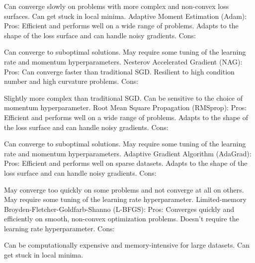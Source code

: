 Can converge slowly on problems with more complex and non-convex loss surfaces.
Can get stuck in local minima.
Adaptive Moment Estimation (Adam):
Pros:
Efficient and performs well on a wide range of problems.
Adapts to the shape of the loss surface and can handle noisy gradients.
Cons:

Can converge to suboptimal solutions.
May require some tuning of the learning rate and momentum hyperparameters.
Nesterov Accelerated Gradient (NAG):
Pros:
Can converge faster than traditional SGD.
Resilient to high condition number and high curvature problems.
Cons:

Slightly more complex than traditional SGD.
Can be sensitive to the choice of momentum hyperparameter.
Root Mean Square Propagation (RMSprop):
Pros:
Efficient and performs well on a wide range of problems.
Adapts to the shape of the loss surface and can handle noisy gradients.
Cons:

Can converge to suboptimal solutions.
May require some tuning of the learning rate and momentum hyperparameters.
Adaptive Gradient Algorithm (AdaGrad):
Pros:
Efficient and performs well on sparse datasets.
Adapts to the shape of the loss surface and can handle noisy gradients.
Cons:

May converge too quickly on some problems and not converge at all on others.
May require some tuning of the learning rate hyperparameter.
Limited-memory Broyden-Fletcher-Goldfarb-Shanno (L-BFGS):
Pros:
Converges quickly and efficiently on smooth, non-convex optimization problems.
Doesn't require the learning rate hyperparameter.
Cons:

Can be computationally expensive and memory-intensive for large datasets.
Can get stuck in local minima.